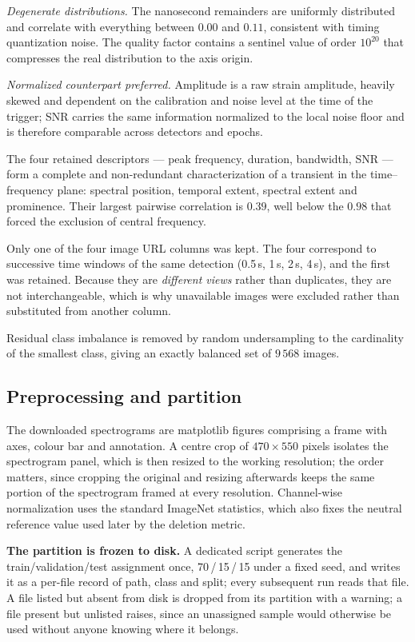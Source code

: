 \emph{Degenerate distributions.} The nanosecond remainders are uniformly
distributed and correlate with everything between $0.00$ and $0.11$, consistent
with timing quantization noise. The quality factor contains a sentinel value of
order $10^{20}$ that compresses the real distribution to the axis origin.

\emph{Normalized counterpart preferred.} Amplitude is a raw strain amplitude,
heavily skewed and dependent on the calibration and noise level at the time of
the trigger; SNR carries the same information normalized to the local noise floor
and is therefore comparable across detectors and epochs.

The four retained descriptors --- peak frequency, duration, bandwidth, SNR ---
form a complete and non-redundant characterization of a transient in the
time--frequency plane: spectral position, temporal extent, spectral extent and
prominence. Their largest pairwise correlation is $0.39$, well below the $0.98$
that forced the exclusion of central frequency.

Only one of the four image URL columns was kept. The four correspond to
successive time windows of the same detection (0.5\,s, 1\,s, 2\,s, 4\,s), and the
first was retained. Because they are \emph{different views} rather than
duplicates, they are not interchangeable, which is why unavailable images were
excluded rather than substituted from another column.

Residual class imbalance is removed by random undersampling to the cardinality of
the smallest class, giving an exactly balanced set of $9\,568$ images.

\subsection{Preprocessing and partition}

The downloaded spectrograms are matplotlib figures comprising a frame with axes,
colour bar and annotation. A centre crop of $470 \times 550$ pixels isolates the
spectrogram panel, which is then resized to the working resolution; the order
matters, since cropping the original and resizing afterwards keeps the same
portion of the spectrogram framed at every resolution. Channel-wise
normalization uses the standard ImageNet statistics, which also fixes the neutral
reference value used later by the deletion metric.

\textbf{The partition is frozen to disk.} A dedicated script generates the
train/validation/test assignment once, 70\,/\,15\,/\,15 under a fixed seed, and
writes it as a per-file record of path, class and split; every subsequent run
reads that file. A file listed but absent from disk is dropped from its partition
with a warning; a file present but unlisted raises, since an unassigned sample
would otherwise be used without anyone knowing where it belongs.

